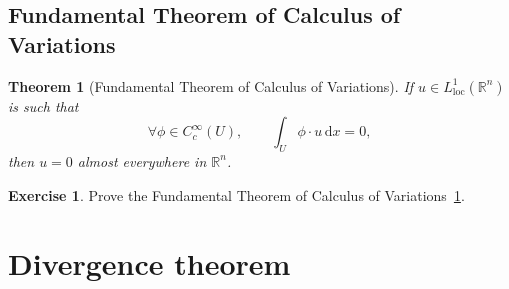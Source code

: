\documentclass[a4paper,9pt]{amsart}
\newcommand{\R}{\mathbb{R}}	%
\newcommand{\did}{\,\mathrm{d}}	%
\newcommand{\de}{\partial}		%
\newcommand{\loc}{\mathrm{loc}}
\theoremstyle{plain}
\newtheorem{theorem}[proposition]{Theorem}
\theoremstyle{definition}
\newtheorem{exercise}[proposition]{Exercise}%
\theoremstyle{remark}
\begin{document}
%	

\subsection{Fundamental Theorem of Calculus of Variations}

\begin{theorem}[Fundamental Theorem of Calculus of Variations]\label{thm67c2eb77}
	If $u\in L^1_\loc(\R^n)$ is such that
	\begin{equation}\label{eq67c2ebaf}
		\forall\phi\in C^\infty_c(U) ,
		\qquad
		\int_U \phi\cdot u \did x = 0 ,
	\end{equation}
	then $u=0$ almost everywhere in $\R^n$.
\end{theorem}

\begin{exercise}
	Prove the Fundamental Theorem of Calculus of Variations~\ref{thm67c2eb77}.
\end{exercise}

\section{Divergence theorem}
\end{document}
